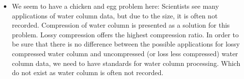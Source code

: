 \begin{itemize}
{\begin{itemize}
\begin{itemize}
\item Could we improve compression rate if the 'header data' is compressed as well? \footnote{I would not expect that this is the case as I expect that the sample data is far larger (>95\%) than the header data. But this is an assumption}
\item This means that the algorithm needs to have knowledge of the encoding of the data which makes a generic implementation harder than it would be with a compression method that does not need to have that knowledge.
\end{itemize}
\item We seem to have a chicken and egg problem here: Scientists see many applications of water column data, but due to the size, it is often not recorded. Compression of water column is presented as a solution for this problem. Lossy compression offers the highest compression ratio. In order to be sure that there is no difference between the possible applications for lossy compressed water column and uncompressed (or loss less compressed) water column data, we need to have standards for water column processing. Which do not exist as water column is often not recorded.
\end{itemize}}
\end{itemize}